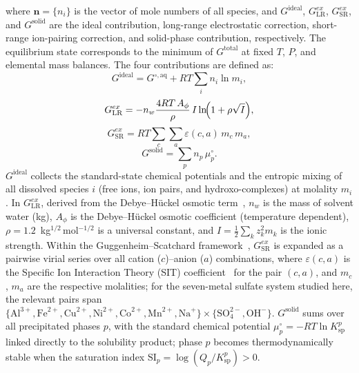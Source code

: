 \documentclass[final,2p,times]{elsarticle}
\begin{document}
\noindent
where $\mathbf{n} = \{n_i\}$ is the vector of mole numbers of all species, and $G^{\text{ideal}}$, $G^{ex}_{\text{LR}}$, $G^{ex}_{\text{SR}}$, and $G^{\text{solid}}$ are the ideal contribution, long-range electrostatic correction, short-range ion-pairing correction, and solid-phase contribution, respectively. The equilibrium state corresponds to the minimum of $G^{\text{total}}$ at fixed $T$, $P$, and elemental mass balances. The four contributions are defined as:
\begin{equation}
G^{\text{ideal}} = G^{\circ,\text{aq}} + RT\sum_i n_i \ln m_i ,
\label{eq:Gideal}
\end{equation}
%
\begin{equation}
G^{ex}_{\text{LR}} = -n_w \frac{4RT\,A_\phi}{\rho}\,
   I\ln\!\Bigl(1 + \rho\sqrt{I}\Bigr),
\label{eq:GLR}
\end{equation}
%
\begin{equation}
G^{ex}_{\text{SR}} = RT\sum_{c}\sum_{a}\varepsilon(c,a)\,m_c\,m_a ,
\label{eq:GSR}
\end{equation}
%
\begin{equation}
G^{\text{solid}} = \sum_p n_p\,\mu_p^{\circ} .
\label{eq:Gsolid}
\end{equation}
$G^{\text{ideal}}$ collects the standard-state chemical potentials and the entropic mixing of all dissolved species $i$ (free ions, ion pairs, and hydroxo-complexes) at molality $m_i$. In $G^{ex}_{\text{LR}}$, derived from the Debye--H\"uckel osmotic term~\cite{huckel_zur_1924}, $n_w$ is the mass of solvent water (kg), $A_\phi$ is the Debye--H\"uckel osmotic coefficient (temperature dependent), $\rho = 1.2$~kg$^{1/2}$\,mol$^{-1/2}$ is a universal constant, and $I = \tfrac{1}{2}\sum_k z_k^2 m_k$ is the ionic strength. Within the Guggenheim--Scatchard framework~\cite{scatchard_concentrated_1936,pitzer_thermodynamics_1973}, $G^{ex}_{\text{SR}}$ is expanded as a pairwise virial series over all cation ($c$)--anion ($a$) combinations, where $\varepsilon(c,a)$ is the Specific Ion Interaction Theory (SIT) coefficient~\cite{guggenheim_specific_1955} for the pair $(c,a)$, and $m_c$, $m_a$ are the respective molalities; for the seven-metal sulfate system studied here, the relevant pairs span $\{\text{Al}^{3+},\text{Fe}^{2+},\text{Cu}^{2+},\text{Ni}^{2+},\text{Co}^{2+},\text{Mn}^{2+},\text{Na}^{+}\} \times \{\text{SO}_4^{2-},\text{OH}^{-}\}$. $G^{\text{solid}}$ sums over all precipitated phases $p$, with the standard chemical potential $\mu_p^{\circ} = -RT\ln K_{\text{sp}}^p$ linked directly to the solubility product; phase $p$ becomes thermodynamically stable when the saturation index $\text{SI}_p = \log(Q_p/K_{\text{sp}}^p) > 0$.
\end{document}
